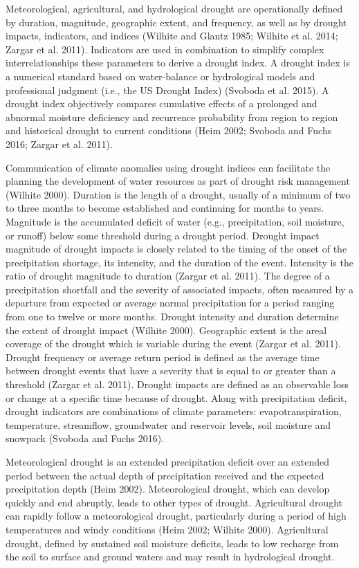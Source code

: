 \documentclass[12pt,twoside]{reedthesis}
\theoremstyle{definition}
\theoremstyle{definition}
\theoremstyle{definition}
\theoremstyle{remark}
\begin{document}
Meteorological, agricultural, and hydrological drought are operationally
defined by duration, magnitude, geographic extent, and frequency, as
well as by drought impacts, indicators, and indices (Wilhite and Glantz
1985; Wilhite et al. 2014; Zargar et al. 2011). Indicators are used in
combination to simplify complex interrelationships these parameters to
derive a drought index. A drought index is a numerical standard based on
water-balance or hydrological models and professional judgment (i.e.,
the US Drought Index) (Svoboda et al. 2015). A drought index objectively
compares cumulative effects of a prolonged and abnormal moisture
deficiency and recurrence probability from region to region and
historical drought to current conditions (Heim 2002; Svoboda and Fuchs
2016; Zargar et al. 2011).

Communication of climate anomalies using drought indices can facilitate
the planning the development of water resources as part of drought risk
management (Wilhite 2000). Duration is the length of a drought, usually
of a minimum of two to three months to become established and continuing
for months to years. Magnitude is the accumulated deficit of water
(e.g., precipitation, soil moisture, or runoff) below some threshold
during a drought period. Drought impact magnitude of drought impacts is
closely related to the timing of the onset of the precipitation
shortage, its intensity, and the duration of the event. Intensity is the
ratio of drought magnitude to duration (Zargar et al. 2011). The degree
of a precipitation shortfall and the severity of associated impacts,
often measured by a departure from expected or average normal
precipitation for a period ranging from one to twelve or more months.
Drought intensity and duration determine the extent of drought impact
(Wilhite 2000). Geographic extent is the areal coverage of the drought
which is variable during the event (Zargar et al. 2011). Drought
frequency or average return period is defined as the average time
between drought events that have a severity that is equal to or greater
than a threshold (Zargar et al. 2011). Drought impacts are defined as an
observable loss or change at a specific time because of drought. Along
with precipitation deficit, drought indicators are combinations of
climate parameters: evapotranspiration, temperature, streamflow,
groundwater and reservoir levels, soil moisture and snowpack (Svoboda
and Fuchs 2016).

Meteorological drought is an extended precipitation deficit over an
extended period between the actual depth of precipitation received and
the expected precipitation depth (Heim 2002). Meteorological drought,
which can develop quickly and end abruptly, leads to other types of
drought. Agricultural drought can rapidly follow a meteorological
drought, particularly during a period of high temperatures and windy
conditions (Heim 2002; Wilhite 2000). Agricultural drought, defined by
sustained soil moisture deficits, leads to low recharge from the soil to
surface and ground waters and may result in hydrological drought.
\end{document}
